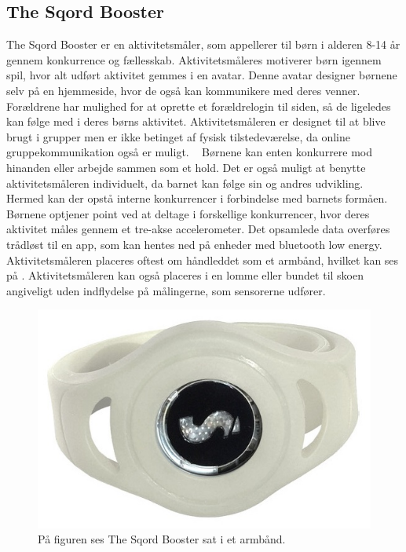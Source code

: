 \subsection{The Sqord Booster}
The Sqord Booster er en aktivitetsmåler, som appellerer til børn i alderen 8-14 år gennem konkurrence og fællesskab. Aktivitetsmåleres motiverer børn igennem spil, hvor alt udført aktivitet gemmes i en avatar. Denne avatar designer børnene selv på en hjemmeside, hvor de også kan kommunikere med deres venner. Forældrene har mulighed for at oprette et forældrelogin til siden, så de ligeledes kan følge med i deres børns aktivitet. Aktivitetsmåleren er designet til at blive brugt i grupper men er ikke betinget af fysisk tilstedeværelse, da online gruppekommunikation også er muligt.%
~\citep{Sqord_family2015} Børnene kan enten konkurrere mod hinanden eller arbejde sammen som et hold. Det er også muligt at benytte aktivitetsmåleren individuelt, da barnet kan følge sin og andres udvikling. Hermed kan der opstå interne konkurrencer i forbindelse med barnets formåen. \citep{Sqord_family2015,Sqord_group2015} \\
Børnene optjener point ved at deltage i forskellige konkurrencer, hvor deres aktivitet måles gennem et tre-akse accelerometer. Det opsamlede data overføres trådløst til en app, som kan hentes ned på enheder med bluetooth low energy. Aktivitetsmåleren placeres oftest om håndleddet som et armbånd, hvilket kan ses på . Aktivitetsmåleren kan også placeres i en lomme eller bundet til skoen angiveligt uden indflydelse på målingerne, som sensorerne udfører. \citep{Sqord_family2015}
\begin{figure}[H]
	\centering
	\includegraphics[scale=0.31]{figures/aProblemanalyse/sqord.JPG}
	\caption{På figuren ses The Sqord Booster sat i et armbånd. \citep{Sqord2016}}
	\label{fig:sqord}
\end{figure}
